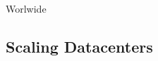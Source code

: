 \documentclass[aspectratio=43]{beamer}
\begin{document}
{
\begin{frame}{Worlwide}
\end{frame}
}

\subsection{Scaling Datacenters}
\end{document}
